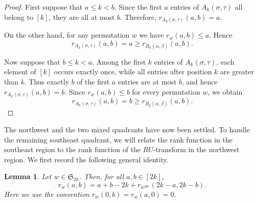 \documentclass[12pt]{amsart}
\newtheorem{lem}[thm]{Lemma}
\theoremstyle{definition}
\numberwithin{equation}{section}
\begin{document}
\begin{proof}
First suppose that $a\leq k<b$. Since the first $a$ entries of
$A_k(\sigma,\tau)$ all belong to $[k]$, they are all at most $b$.
Therefore, $r_{A_k(\sigma,\tau)}(a,b)=a$.

On the other hand, for any permutation $w$ we have
$r_w(a,b)\leq a$. Hence
\begin{equation*}
r_{A_k(\sigma,\tau)}(a,b)
=
a
\geq
r_{B_k(\alpha,\beta)}(a,b).
\end{equation*}

Now suppose that $b\leq k<a$. Among the first $k$ entries of
$A_k(\sigma,\tau)$, each element of $[k]$ occurs exactly once, while
all entries after position $k$ are greater than $k$. Thus exactly $b$
of the first $a$ entries are at most $b$, and hence
$r_{A_k(\sigma,\tau)}(a,b)=b$.
Since $r_w(a,b)\leq b$ for every permutation $w$, we obtain
\begin{equation*}
r_{A_k(\sigma,\tau)}(a,b)
=
b
\geq
r_{B_k(\alpha,\beta)}(a,b).
\end{equation*}
\end{proof}

The northwest and the two mixed quadrants have now been settled. To
handle the remaining southeast quadrant, we will relate the rank
function in the southeast region to the rank function of the
$RU$-transform in the northwest region. We first record the following
general identity.

\begin{lem}\label{l:rank RU}
Let $w\in\mathfrak S_{2k}$. Then, for all $a,b\in[2k]$,
\begin{equation}
r_w(a,b)
=
a+b-2k
+
r_{w^{RU}}(2k-a,2k-b).
\label{eq:rank RU}
\end{equation}
Here we use the convention
$r_w(0,b)=r_w(a,0)=0$.
\end{lem}
\end{document}
